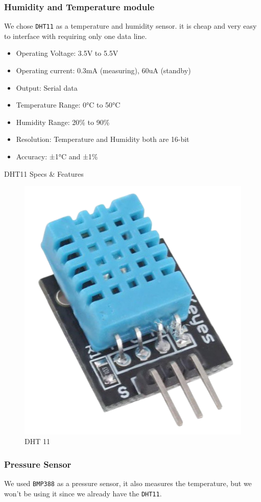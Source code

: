 \subsubsection{Humidity and Temperature module}
We chose \verb|DHT11| as a temperature and humidity sensor. it is cheap and very easy to interface with requiring only one data line.

\begin{itemize}
    \item Operating Voltage: 3.5V to 5.5V
    \item Operating current: 0.3mA (measuring), 60uA (standby)
    \item Output: Serial data
    \item Temperature Range: 0°C to 50°C
    \item Humidity Range: 20\% to 90\%
    \item Resolution: Temperature and Humidity both are 16-bit
    \item Accuracy: ±1°C and ±1\%
\end{itemize}
\begin{table}[H]
    \caption{DHT11 Specs \& Features}
\end{table}
\begin{figure}[H]
    \centering
    \includegraphics[width=.4\textwidth]{images/node/dht11.png}
    \caption{DHT 11}
\end{figure}

\subsubsection{Pressure Sensor}
We used \verb|BMP388| as a pressure sensor, it also measures the temperature, but we won't be using it since we already have the \verb|DHT11|.

